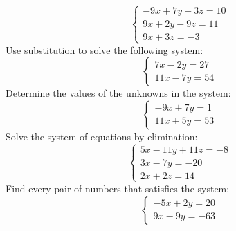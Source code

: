 \documentclass[11pt]{article}
\begin{document}
\label{eq033}\[
  \left\{ \begin{array}{l} -9x + 7y - 3z = 10 \\ 9x + 2y - 9z = 11 \\ 9x + 3z = -3 \end{array} \right.
\]
Use substitution to solve the following system:
\label{eq034}\[
  \left\{ \begin{array}{l} 7x - 2y = 27 \\ 11x - 7y = 54 \end{array} \right.
\]
Determine the values of the unknowns in the system:
\label{eq035}\[
  \left\{ \begin{array}{l} -9x + 7y = 1 \\ 11x + 5y = 53 \end{array} \right.
\]
Solve the system of equations by elimination:
\label{eq036}\[
  \left\{ \begin{array}{l} 5x - 11y + 11z = -8 \\ 3x - 7y = -20 \\ 2x + 2z = 14 \end{array} \right.
\]
Find every pair of numbers that satisfies the system:
\label{eq037}\[
  \left\{ \begin{array}{l} -5x + 2y = 20 \\ 9x - 9y = -63 \end{array} \right.
\]
\end{document}
